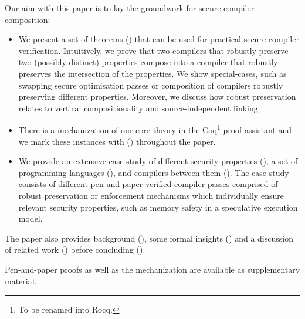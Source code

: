 Our aim with this paper is to lay the groundwork for secure compiler composition:
\begin{itemize}
  \item 
    We present a set of theorems () that can be used for practical secure compiler verification.
    Intuitively, we prove that two compilers that robustly preserve two (possibly distinct) properties compose into a compiler that robustly preserves the intersection of the properties.
    We show special-cases, such as swapping secure optimisation passes or composition of compilers robustly preserving different properties. 
    Moreover, we discuss how robust preservation relates to vertical compositionality and source-independent linking.
  \item
    There is a mechanization of our core-theory in the Coq\footnote{To be renamed into Rocq.} proof assistant and we mark these instances with (\CoqSymbol) throughout the paper.
  \item 
    We provide an extensive case-study of different security properties (), a set of programming languages (), and compilers between them ().
    The case-study consists of different pen-and-paper verified compiler passes comprised of robust preservation or enforcement mechanisms which individually ensure relevant security properties, such as memory safety in a speculative execution model.
\end{itemize}
The paper also provides background (), some formal insights () and a discussion of related work () before concluding ().

Pen-and-paper proofs as well as the mechanization are available as supplementary material.

